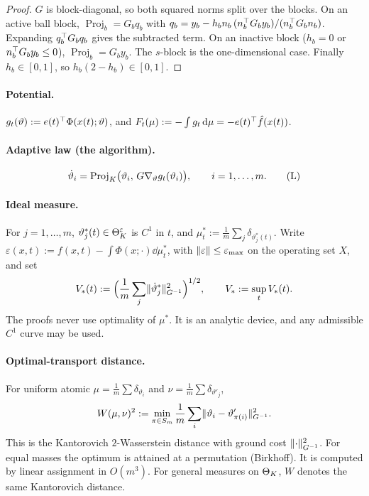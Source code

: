 \begin{proof}
$G$ is block-diagonal, so both squared norms split over the blocks. On an active ball block,
$\operatorname{Proj}_b = G_b q_b$ with $q_b = y_b - h_b n_b\,(n_b^\top G_b y_b)/(n_b^\top G_b n_b)$. Expanding
$q_b^\top G_b q_b$ gives the subtracted term. On an inactive block ($h_b = 0$ or $n_b^\top G_b y_b\le 0$),
$\operatorname{Proj}_b = G_b y_b$. The $s$-block is the one-dimensional case. Finally $h_b\in[0,1]$, so
$h_b(2-h_b)\in[0,1]$.
\end{proof}

\paragraph{Potential.}
$g_t(\vartheta) := e(t)^\top\Phi(x(t);\vartheta)$, and $F_t(\mu) := -\int g_t\,\mathrm{d}\mu = -e(t)^\top\hat f(x(t))$.

\paragraph{Adaptive law (the algorithm).}
\begin{equation}\label{eq:setting:L}
  \dot\vartheta_i = \operatorname{Proj}_K\bigl(\vartheta_i,\, G\nabla_\vartheta g_t(\vartheta_i)\bigr),\qquad i = 1,\dots,m.
  \tag{L}
\end{equation}

\paragraph{Ideal measure.}
For $j = 1,\dots,m$, $\vartheta^*_j(t)\in\Theta_K^{\varepsilon}$ is $C^1$ in $t$, and
$\mu^*_t := \frac1m\sum_j\delta_{\vartheta^*_j(t)}$. Write
$\varepsilon(x,t) := f(x,t) - \int\Phi(x;\cdot)\dd\mu^*_t$, with $\lVert \varepsilon\rVert\le\varepsilon_{\max}$ on the
operating set $X$, and set
\[
  V_*(t) := \Bigl(\frac1m\sum_j\lVert \dot\vartheta^*_j\rVert_{G^{-1}}^2\Bigr)^{1/2},\qquad V_* := \sup_t V_*(t).
\]
The proofs never use optimality of $\mu^*$. It is an analytic device, and any admissible $C^1$ curve may be used.

\paragraph{Optimal-transport distance.}
For uniform atomic $\mu = \frac1m\sum\delta_{\vartheta_i}$ and $\nu = \frac1m\sum\delta_{\vartheta'_j}$,
\[
  W(\mu,\nu)^2 := \min_{\pi\in S_m}\frac1m\sum_i\lVert \vartheta_i-\vartheta'_{\pi(i)}\rVert_{G^{-1}}^2 .
\]
This is the Kantorovich $2$-Wasserstein distance with ground cost $\lVert \cdot\rVert_{G^{-1}}^2$. For equal masses the
optimum is attained at a permutation (Birkhoff). It is computed by linear assignment in $O(m^3)$. For general measures
on $\Theta_K$, $W$ denotes the same Kantorovich distance.

